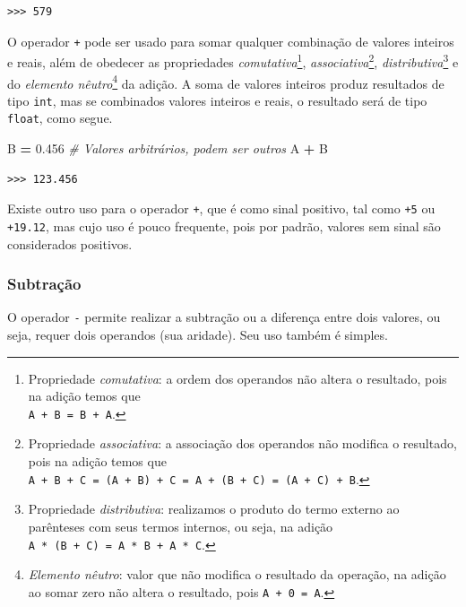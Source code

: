 \documentclass[
]{book}
\newenvironment{Shaded}{\begin{snugshade}}{\end{snugshade}}
\newcommand{\CommentTok}[1]{\textcolor[rgb]{0.56,0.35,0.01}{\textit{#1}}}
\newcommand{\FloatTok}[1]{\textcolor[rgb]{0.00,0.00,0.81}{#1}}
\newcommand{\NormalTok}[1]{#1}
\newcommand{\OperatorTok}[1]{\textcolor[rgb]{0.81,0.36,0.00}{\textbf{#1}}}
\begin{document}
\begin{verbatim}
>>> 579
\end{verbatim}

O operador \texttt{+} pode ser usado para somar qualquer combinação de valores inteiros e reais, além de obedecer as propriedades \emph{comutativa}\footnote{Propriedade \emph{comutativa}: a ordem dos operandos não altera o resultado, pois na adição temos que\\
  \texttt{A\ +\ B\ =\ B\ +\ A}.}, \emph{associativa}\footnote{Propriedade \emph{associativa}: a associação dos operandos não modifica o resultado, pois na adição temos que\\
  \texttt{A\ +\ B\ +\ C\ =\ (A\ +\ B)\ +\ C\ =\ A\ +\ (B\ +\ C)\ =\ (A\ +\ C)\ +\ B}.}, \emph{distributiva}\footnote{Propriedade \emph{distributiva}: realizamos o produto do termo externo ao parênteses com seus termos internos, ou seja, na adição \texttt{A\ *\ (B\ +\ C)\ =\ A\ *\ B\ +\ A\ *\ C}.} e do \emph{elemento nêutro}\footnote{\emph{Elemento nêutro}: valor que não modifica o resultado da operação, na adição ao somar zero não altera o resultado, pois \texttt{A\ +\ 0\ =\ A}.} da adição. A soma de valores inteiros produz resultados de tipo \texttt{int}, mas se combinados valores inteiros e reais, o resultado será de tipo \texttt{float}, como segue.

\begin{Shaded}
\begin{Highlighting}[]
\NormalTok{B }\OperatorTok{=} \FloatTok{0.456} \CommentTok{\# Valores arbitrários, podem ser outros}
\NormalTok{A }\OperatorTok{+}\NormalTok{ B}
\end{Highlighting}
\end{Shaded}

\begin{verbatim}
>>> 123.456
\end{verbatim}

Existe outro uso para o operador \texttt{+}, que é como sinal positivo, tal como \texttt{+5} ou \texttt{+19.12}, mas cujo uso é pouco frequente, pois por padrão, valores sem sinal são considerados positivos.

\hypertarget{subtrauxe7uxe3o}{%
\subsubsection{Subtração}\label{subtrauxe7uxe3o}}

O operador \texttt{-} permite realizar a subtração ou a diferença entre dois valores, ou seja, requer dois operandos (sua aridade). Seu uso também é simples.
\end{document}
